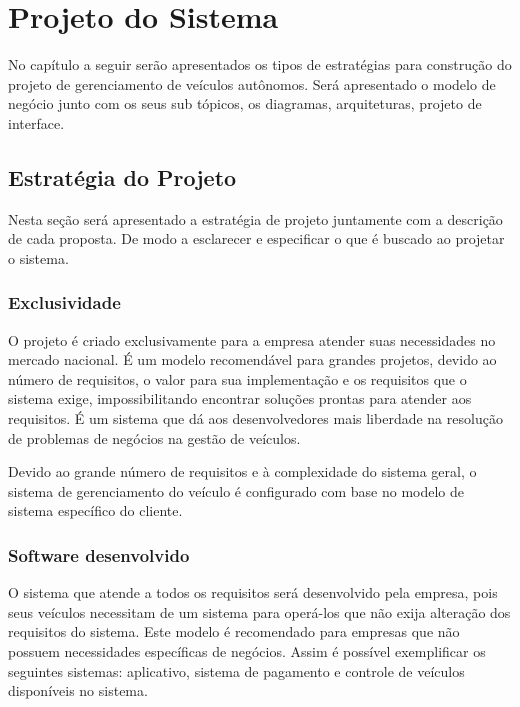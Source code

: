 
\chapter{Projeto do Sistema}
No capítulo a seguir serão apresentados os tipos de estratégias para construção do projeto de gerenciamento de veículos autônomos.
Será apresentado o modelo de negócio junto com os seus sub tópicos, os diagramas, arquiteturas, projeto de interface.

\section{Estrat\'{e}gia do Projeto}
Nesta seção será apresentado a estratégia de projeto juntamente com a descrição de cada proposta.
De modo a esclarecer e especificar o que é buscado ao projetar o sistema.
\subsection{Exclusividade}
O projeto é criado exclusivamente para a empresa atender suas necessidades no mercado nacional. É um modelo recomendável para grandes projetos, devido ao número de requisitos, o valor para sua implementação e os requisitos que o sistema exige, impossibilitando encontrar soluções prontas para atender aos requisitos. É um sistema que dá aos desenvolvedores mais liberdade na resolução de problemas de negócios na gestão de veículos.

Devido ao grande número de requisitos e à complexidade do sistema geral, o sistema de gerenciamento do veículo é configurado com base no modelo de sistema específico do cliente.



\subsection{Software desenvolvido}
O sistema que atende a todos os requisitos será desenvolvido pela empresa, pois seus veículos necessitam de um sistema para operá-los que não exija alteração dos requisitos do sistema. Este modelo é recomendado para empresas que não possuem necessidades específicas de negócios. Assim é possível exemplificar os seguintes sistemas: aplicativo, sistema de pagamento e controle de veículos disponíveis no sistema.

